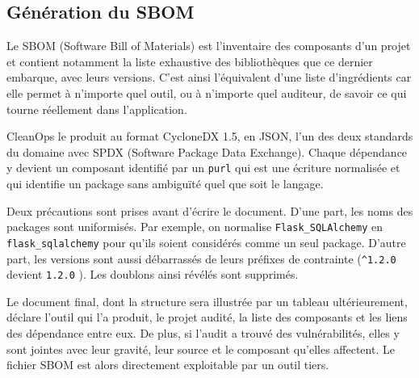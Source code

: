 \documentclass[a4paper,12pt]{article}
\begin{document}
\subsection{Génération du SBOM}\label{guxe9nuxe9ration-du-sbom}

Le SBOM (Software Bill of Materials) est l'inventaire des composants
d'un projet et contient notamment la liste exhaustive des bibliothèques
que ce dernier embarque, avec leurs versions. C'est ainsi l'équivalent
d'une liste d'ingrédients car elle permet à n'importe quel outil, ou à
n'importe quel auditeur, de savoir ce qui tourne réellement dans
l'application.

CleanOps le produit au format CycloneDX 1.5, en JSON, l'un des deux
standards du domaine avec SPDX (Software Package Data Exchange). Chaque
dépendance y devient un composant identifié par un \texttt{purl} qui est
une écriture normalisée et qui identifie un package sans ambiguïté quel
que soit le langage.

Deux précautions sont prises avant d'écrire le document. D'une part, les
noms des packages sont uniformisés. Par exemple, on normalise
\texttt{Flask\_\allowbreak{}SQLAlchemy} en
\texttt{flask\_\allowbreak{}sqlalchemy} pour qu'ils soient considérés
comme un seul package. D'autre part, les versions sont aussi débarrassés
de leurs préfixes de contrainte (\texttt{\^{}1.2.0} devient
\texttt{1.2.0} ). Les doublons ainsi révélés sont supprimés.

Le document final, dont la structure sera illustrée par un tableau
ultérieurement, déclare l'outil qui l'a produit, le projet audité, la
liste des composants et les liens des dépendance entre eux. De plus, si
l'audit a trouvé des vulnérabilités, elles y sont jointes avec leur
gravité, leur source et le composant qu'elles affectent. Le fichier SBOM
est alors directement exploitable par un outil tiers.
\end{document}
